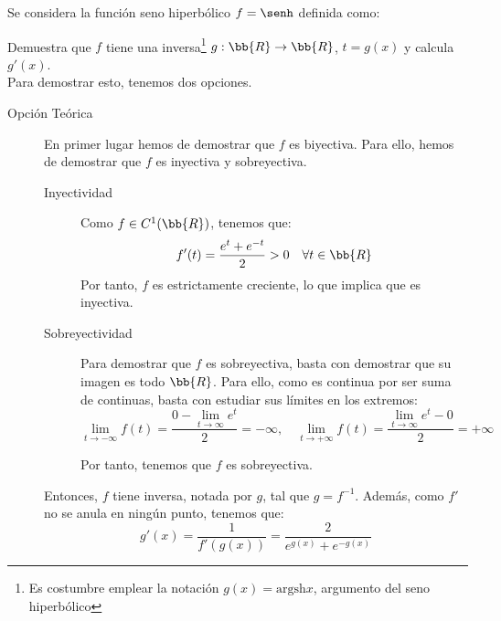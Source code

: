 \documentclass[12pt]{article}
\begin{document}
    \begin{ejercicio}
        Se considera la función seno hiperbólico $f=\senh$ definida como:

        Demuestra que $f$ tiene una inversa\footnote{Es costumbre emplear la notación $g(x) = \text{argsh} x$, argumento del seno hiperbólico} $g:\bb{R}\to\bb{R}$, $t=g(x)$ y calcula $g'(x)$.\\

        Para demostrar esto, tenemos dos opciones.
        \begin{description}
            \item[Opción Teórica]
            
            En primer lugar hemos de demostrar que $f$ es biyectiva. Para ello, hemos de demostrar que $f$ es inyectiva y sobreyectiva.
            \begin{description}
                \item[Inyectividad] Como $f\in C^1(\bb{R})$, tenemos que:
                \begin{equation*}
                    f'(t) = \dfrac{e^t+e^{-t}}{2} > 0 \quad \forall t\in \bb{R}
                \end{equation*} 
                Por tanto, $f$ es estrictamente creciente, lo que implica que es inyectiva.

                \item[Sobreyectividad] Para demostrar que $f$ es sobreyectiva, basta con demostrar que su imagen es todo $\bb{R}$. Para ello, como es continua por ser suma de continuas, basta con estudiar sus límites en los extremos:
                \begin{equation*}
                    \lim_{t\to -\infty} f(t) = \dfrac{0-\lim\limits_{t\to \infty}e^{t}}{2} = -\infty, \quad \lim_{t\to +\infty} f(t) = \dfrac{\lim\limits_{t\to \infty}e^{t}-0}{2} = +\infty
                \end{equation*}

                Por tanto, tenemos que $f$ es sobreyectiva.
            \end{description}
            Entonces, $f$ tiene inversa, notada por $g$, tal que $g=f^{-1}$.
            Además, como $f'$ no se anula en ningún punto, tenemos que:
            \begin{equation*}
                g'(x) = \dfrac{1}{f'(g(x))}
                = \dfrac{2}{e^{g(x)}+e^{-g(x)}}
            \end{equation*}


\end{description}
\end{ejercicio}
\end{document}
